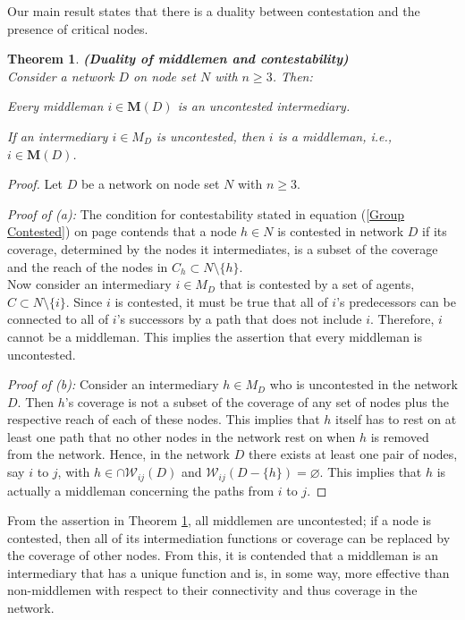 \documentclass[11pt,fleqn]{article}
\newcounter{llst}
\newenvironment{abet}{\begin{list}{\rm (\alph{llst})}{\usecounter{llst}
\setlength{\itemindent}{0em} \setlength{\leftmargin}{3em}
\setlength{\labelwidth}{2em} \setlength{\labelsep}{1em}}}{\end{list}}
\newtheorem{theorem}{Theorem}[section]
\begin{document}
Our main result states that there is a duality between contestation and the presence of critical nodes.
\begin{theorem} \label{duality} \textbf{\emph{(Duality of middlemen and contestability)}} \\
Consider a network $D$ on node set $N$ with $n \geqslant 3$. Then:
\begin{abet}
	\item Every middleman $i \in \mathbf M (D)$ is an uncontested intermediary.
	\item If an intermediary $i \in M_D$ is uncontested, then $i$ is a middleman, i.e., $i \in \mathbf M (D)$.
\end{abet}
\end{theorem}
\begin{proof}
Let $D$ be a network on node set $N$ with $n \geqslant 3$.

\smallskip\noindent
\emph{Proof of (a):}
The condition for contestability stated in equation (\ref{Group Contested}) on page \pageref{Group Contested} contends that a node $h \in N$ is contested in network $D$ if its coverage, determined by the nodes it intermediates, is a subset of the coverage and the reach of the nodes in $C_{h} \subset N \setminus \{ h \}$.
\\
Now consider an intermediary $i \in M_D$ that is contested by a set of agents, $C \subset N \setminus \{ i \}$. Since $i$ is contested, it must be true that all of $i$'s predecessors can be connected to all of $i$'s successors by a path that does not include $i$. Therefore, $i$ cannot be a middleman. This implies the assertion that every middleman is uncontested.

\smallskip\noindent
\emph{Proof of (b):}
Consider an intermediary $h \in M_D$ who is uncontested in the network $D$. Then $h$'s coverage is not a subset of the coverage of any set of nodes plus the respective reach of each of these nodes. This implies that $h$ itself has to rest on at least one path that no other nodes in the network rest on when $h$ is removed from the network. Hence, in the network $D$ there exists at least one pair of nodes, say $i$ to $j$, with $h \in \cap \mathcal{W}_{ij} (D)$ and $\mathcal{W}_{ij}(D - \{h\}) = \varnothing$. This implies that $h$ is actually a middleman concerning the paths from $i$ to $j$.
\end{proof}

\medskip\noindent
From the assertion in Theorem \ref{duality}, all middlemen are uncontested; if a node is contested, then all of its intermediation functions or coverage can be replaced by the coverage of other nodes. From this, it is contended that a middleman is an intermediary that has a unique function and is, in some way, more effective than non-middlemen with respect to their connectivity and thus coverage in the network.
\end{document}
